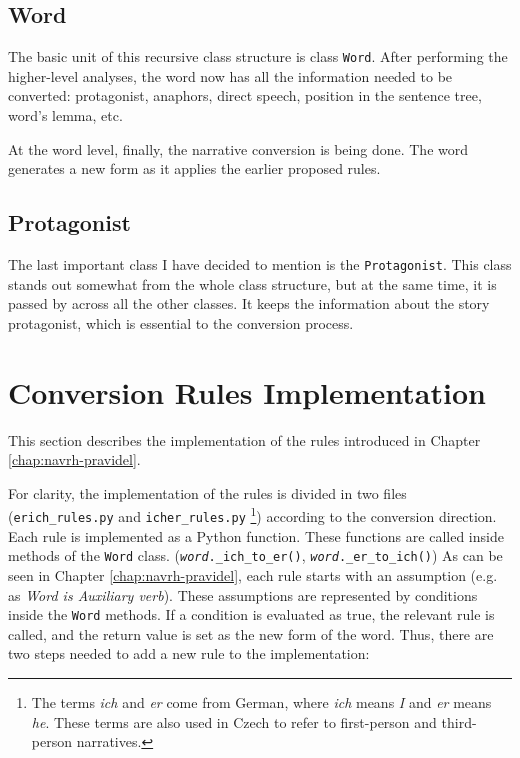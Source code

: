 \subsection{Word}

The basic unit of this recursive class structure is class \texttt{Word}. After performing the higher-level analyses, the word now has all the information needed to be converted: protagonist, anaphors, direct speech, position in the sentence tree, word's lemma, etc.

At the word level, finally, the narrative conversion is being done. The word generates a new form as it applies the earlier proposed rules.

\subsection{Protagonist}

The last important class I have decided to mention is the \texttt{Protagonist}. This class stands out somewhat from the whole class structure, but at the same time, it is passed by across all the other classes. It keeps the information about the story protagonist, which is essential to the conversion process.

\section{Conversion Rules Implementation}

This section describes the implementation of the rules introduced in Chapter \ref{chap:navrh-pravidel}.

For clarity, the implementation of the rules is divided in two files (\texttt{erich\_rules.py} and \texttt{icher\_rules.py} \footnote{The terms \emph{ich} and \emph{er} come from German, where \emph{ich} means \emph{I} and \emph{er} means \emph{he}. These terms are also used in Czech to refer to first-person and third-person narratives.})  according to the conversion direction. Each rule is implemented as a Python function. These functions are called inside methods of the \texttt{Word} class. (\texttt{\emph{word}.\_ich\_to\_er()}, \texttt{\emph{word}.\_er\_to\_ich()})
As can be seen in Chapter \ref{chap:navrh-pravidel}, each rule starts with an assumption (e.g. as \emph{Word is Auxiliary verb}). These assumptions are represented by conditions inside the \texttt{Word} methods. If a condition is evaluated as true, the relevant rule is called, and the return value is set as the new form of the word.
Thus, there are two steps needed to add a new rule to the implementation:

